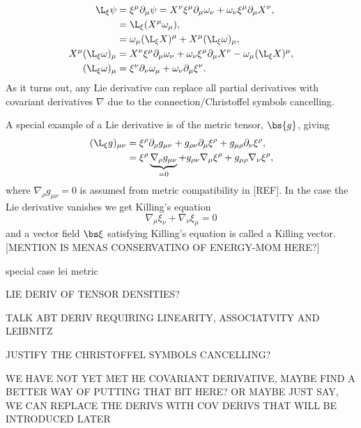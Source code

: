 \begin{align}
\L_\xi \psi &= \xi^\mu \partial_\mu \psi =  X^\nu\xi^\mu\partial_\mu\omega_\nu+\omega_\nu\xi^\mu\partial_\mu X^\nu, \\
              &= \L_\xi (X^\mu \omega_\mu),\\
              &= \omega_\mu (\L_\xi X)^\mu + X^\mu(\L_\xi\omega)_\mu,\\
               X^\mu(\L_\xi \omega)_\mu & =X^\nu\xi^\mu\partial_\mu\omega_\nu+\omega_\nu\xi^\mu\partial_\mu X^\nu-\omega_\mu (\L_\xi X)^\mu, \\
               (\L_\xi \omega)_\mu&= \xi^\nu \partial_\nu \omega_\mu + \omega_\nu \partial_\mu \xi^\nu.
\end{align}
As it turns out, any Lie derivative can replace all partial derivatives with covariant derivatives $\nabla$ due to the connection/Christoffel symbols cancelling.

A special example of a Lie derivative is of the metric tensor, $\bs{g}$, giving
\begin{align}
(\L_\xi g)_{\mu\nu} &= \xi^\rho \partial_\rho g_{\mu\nu} + g_{\rho\nu}\partial_\mu \xi^\rho + g_{\mu\rho}\partial_\nu \xi^\rho, \\
&= \xi^\rho \underbrace{\nabla_\rho g_{\mu\nu}}_{=0} + g_{\rho\nu}\nabla_\mu \xi^\rho  + g_{\mu\rho}\nabla_\nu \xi^\rho, \\
\end{align}
where $\nabla_\rho g_{\mu\nu}=0$ is assumed from metric compatibility in [REF]. In the case the Lie derivative vanishes we get Killing's equation
\begin{equation}
\nabla_{\mu}\xi_\nu + \nabla_\nu \xi_\mu =0
\end{equation} 
and a vector field $\bs\xi$ satisfying Killing's equation is called a Killing vector. [MENTION IS MENAS CONSERVATINO OF ENERGY-MOM HERE?]

special case lei metric


LIE DERIV OF TENSOR DENSITIES?

TALK ABT DERIV REQUIRING LINEARITY, ASSOCIATVITY AND LEIBNITZ

JUSTIFY THE CHRISTOFFEL SYMBOLS CANCELLING?

WE HAVE NOT YET MET HE COVARIANT DERIVATIVE, MAYBE FIND A BETTER WAY OF PUTTING THAT BIT HERE? OR MAYBE JUST SAY, WE CAN REPLACE THE DERIVS WITH COV DERIVS THAT WILL BE INTRODUCED LATER











